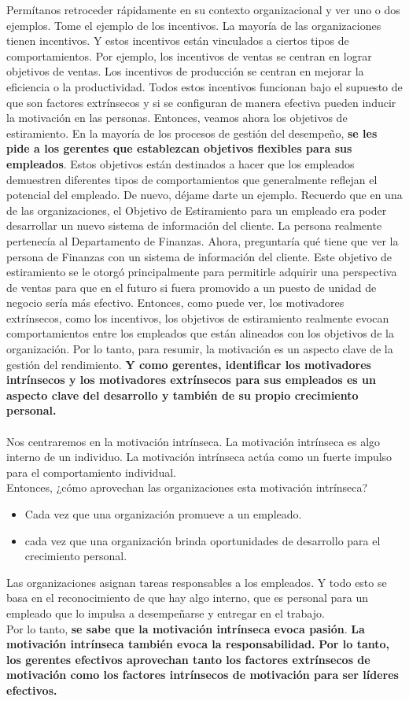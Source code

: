 \documentclass[10pt]{book}
\begin{document}
Permítanos retroceder rápidamente en su contexto organizacional y ver uno o dos ejemplos. Tome el ejemplo de los incentivos. La mayoría de las organizaciones tienen incentivos. Y estos incentivos están vinculados a ciertos tipos de comportamientos. Por ejemplo, los incentivos de ventas se centran en lograr objetivos de ventas. Los incentivos de producción se centran en mejorar la eficiencia o la productividad. Todos estos incentivos funcionan bajo el supuesto de que son factores extrínsecos y si se configuran de manera efectiva pueden inducir la motivación en las personas. Entonces, veamos ahora los objetivos de estiramiento. En la mayoría de los procesos de gestión del desempeño, \textbf{se les pide a los gerentes que establezcan objetivos flexibles para sus empleados}. Estos objetivos están destinados a hacer que los empleados demuestren diferentes tipos de comportamientos que generalmente reflejan el potencial del empleado. De nuevo, déjame darte un ejemplo. Recuerdo que en una de las organizaciones, el Objetivo de Estiramiento para un empleado era poder desarrollar un nuevo sistema de información del cliente. La persona realmente pertenecía al Departamento de Finanzas. Ahora, preguntaría qué tiene que ver la persona de Finanzas con un sistema de información del cliente. Este objetivo de estiramiento se le otorgó principalmente para permitirle adquirir una perspectiva de ventas para que en el futuro si fuera promovido a un puesto de unidad de negocio sería más efectivo. Entonces, como puede ver, los motivadores extrínsecos, como los incentivos, los objetivos de estiramiento realmente evocan comportamientos entre los empleados que están alineados con los objetivos de la organización. Por lo tanto, para resumir, la motivación es un aspecto clave de la gestión del rendimiento. \textbf{Y como gerentes, identificar los motivadores intrínsecos y los motivadores extrínsecos para sus empleados es un aspecto clave del desarrollo y también de su propio crecimiento personal.}\\\\
Nos centraremos en la motivación intrínseca. La motivación intrínseca es algo interno de un individuo. La motivación intrínseca actúa como un fuerte impulso para el comportamiento individual.\\
Entonces, ¿cómo aprovechan las organizaciones esta motivación intrínseca? 
\begin{itemize}
\item Cada vez que una organización promueve a un empleado.
\item cada vez que una organización brinda oportunidades de desarrollo para el crecimiento personal.
\end{itemize}
Las organizaciones asignan tareas responsables a los empleados. Y todo esto se basa en el reconocimiento de que hay algo interno, que es personal para un empleado que lo impulsa a desempeñarse y entregar en el trabajo.\\
Por lo tanto, \textbf{se sabe que la motivación intrínseca evoca pasión}. \textbf{La motivación intrínseca también evoca la responsabilidad.}\textbf{ Por lo tanto, los gerentes efectivos aprovechan tanto los factores extrínsecos de motivación como los factores intrínsecos de motivación para ser líderes efectivos.}
\end{document}
